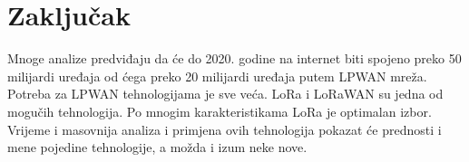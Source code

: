 \chapter{Zaključak}
\label{chapter:uvod}

Mnoge analize predviđaju da će do 2020. godine na internet biti spojeno preko 50 milijardi uređaja od ćega preko 20 milijardi uređaja putem LPWAN mreža. Potreba za LPWAN tehnologijama je sve veća. LoRa i LoRaWAN su jedna od mogučih tehnologija. Po mnogim karakteristikama LoRa je optimalan izbor. Vrijeme i masovnija analiza i primjena ovih tehnologija pokazat će prednosti i mene pojedine tehnologije, a možda i izum neke nove.
